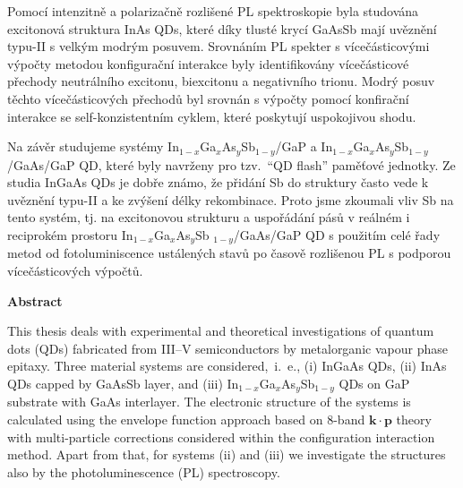 \documentclass[
a4paper, %
11pt, %
onecolumn, %
openany, %
oldfontcommands,
]{memoir}
\begin{document}


Pomocí intenzitně a polarizačně rozlišené PL spektroskopie byla studována excitonová struktura InAs QDs, které díky tlusté krycí GaAsSb mají uvěznění typu-II s velkým modrým posuvem. Srovnáním PL spekter s vícečásticovými výpočty metodou konfigurační interakce byly identifikovány vícečásticové přechody neutrálního excitonu, biexcitonu a negativního trionu. Modrý posuv těchto vícečásticových přechodů byl srovnán s výpočty pomocí konfirační interakce se self-konzistentním cyklem, které poskytují uspokojivou shodu.


Na závěr studujeme systémy In$_{1-x}$Ga$_x$As$_y$Sb$_{1-y}$/GaP a In$_{1-x}$Ga$_x$As$_y$Sb$_{1-y}$/GaAs/GaP QD, které byly navrženy pro tzv.~\enquote{QD flash} paměťové jednotky. Ze studia InGaAs QDs je dobře známo, že přidání Sb do struktury často vede k uvěznění typu-II a ke zvýšení délky rekombinace. Proto jsme zkoumali vliv Sb na tento systém, tj. na excitonovou strukturu a uspořádání pásů v reálném i reciprokém prostoru In$ _ {1-x}$Ga$ _x $As$ _y $Sb $ _ {1-y} $/GaAs/GaP QD s použitím celé řady metod od fotoluminiscence ustálených stavů po časově rozlišenou PL s podporou vícečásticových výpočtů.




\vspace{3cm}
\vfill

\cleardoublepage
\noindent\Large\textbf{Abstract}\\ \normalsize

\noindent This thesis deals with experimental and theoretical investigations of quantum dots (QDs) fabricated from III--V semiconductors by metalorganic vapour phase epitaxy. Three material systems are considered,~i.~e., (i) InGaAs QDs, (ii) InAs QDs capped by GaAsSb layer, and (iii) In$_{1-x}$Ga$_x$As$_y$Sb$_{1-y}$ QDs on GaP substrate with GaAs interlayer. 
The electronic structure of the systems is calculated using the envelope function approach based on 8-band $\mathbf{k\cdot p}$ theory with multi-particle corrections considered within the configuration interaction method. Apart from that, for systems (ii) and (iii) we investigate the structures also by the photoluminescence (PL) spectroscopy.
\end{document}
